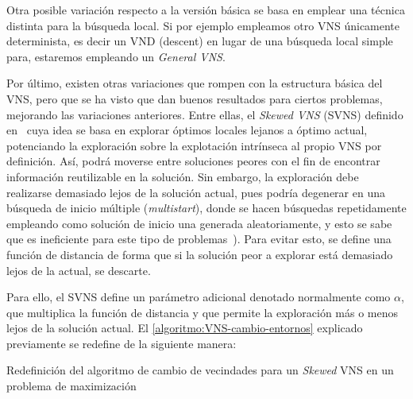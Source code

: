 Otra posible variación respecto a la versión básica se basa en emplear una técnica distinta para la búsqueda local. Si por ejemplo empleamos otro VNS únicamente determinista, es decir un VND (descent) en lugar de una búsqueda local simple para, estaremos empleando un \textit{General VNS}.



Por último, existen otras variaciones que rompen con la estructura básica del VNS, pero que se ha visto que dan buenos resultados para ciertos problemas, mejorando las variaciones anteriores. Entre ellas, el \textit{Skewed VNS} (SVNS) definido en~\cite{svns-def} cuya idea se basa en explorar óptimos locales lejanos a óptimo actual, potenciando la exploración sobre la explotación intrínseca al propio VNS por definición. Así, podrá moverse entre soluciones peores con el fin de encontrar información reutilizable en la solución. Sin embargo, la exploración debe realizarse demasiado lejos de la solución actual, pues podría degenerar en una búsqueda de inicio múltiple (\textit{multistart}), donde se hacen búsquedas repetidamente empleando como solución de inicio una generada aleatoriamente, y esto se sabe que es ineficiente para este tipo de problemas~\cite{vns}). Para evitar esto, se define una función de distancia de forma que si la solución peor a explorar está demasiado lejos de la actual, se descarte.

Para ello, el SVNS define un parámetro adicional denotado normalmente como $\alpha$, que multiplica la función de distancia y que permite la exploración más o menos lejos de la solución actual. El \autoref{algoritmo:VNS-cambio-entornos} explicado previamente se redefine de la siguiente manera:

\begin{algorithm}[h]
    \caption{Redefinición del algoritmo de cambio de vecindades para un \textit{Skewed} VNS en un problema de maximización}
    \label{algoritmo:SVNS-cambio-entornos}

    \DontPrintSemicolon
    \bigskip


\end{algorithm}

